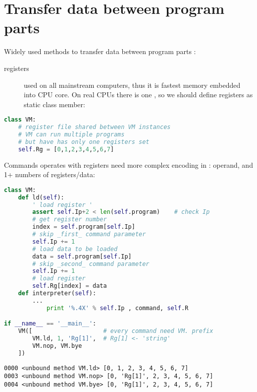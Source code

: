 \section{Transfer data between program parts}

Widely used methods to transfer data between program parts :
\begin{description}
\item[registers] used on all mainstream computers, thus it is fastest memory
embedded into CPU core. On real CPUs there is one
\href{https://en.wikipedia.org/wiki/Register_file}{}, so we
should define registers as static class member:
\end{description}

\begin{lstlisting}[language=python]
class VM:
	# register file shared between VM instances
	# VM can run multiple programs
	# but have has only one registers set 
	self.Rg = [0,1,2,3,4,5,6,7]  
\end{lstlisting}

Commands operates with registers need more complex encoding in : operand, and 1+ numbers of registers/data:

\begin{lstlisting}[language=python]
class VM:
    def ld(self):
        ' load register '
        assert self.Ip+2 < len(self.program)	# check Ip
        # get register number
        index = self.program[self.Ip]
        # skip _first_ command parameter
        self.Ip += 1                 
        # load data to be loaded
        data = self.program[self.Ip] 
        # skip _second_ command parameter
        self.Ip += 1                 
        # load register
        self.Rg[index] = data         
    def interpreter(self):
        ...
            print '%.4X' % self.Ip , command, self.R

if __name__ == '__main__':
    VM([                    # every command need VM. prefix
        VM.ld, 1, 'Rg[1]',  # Rg[1] <- 'string'
        VM.nop, VM.bye
    ])
\end{lstlisting}
\begin{lstlisting}
0000 <unbound method VM.ld> [0, 1, 2, 3, 4, 5, 6, 7]
0003 <unbound method VM.nop> [0, 'Rg[1]', 2, 3, 4, 5, 6, 7]
0004 <unbound method VM.bye> [0, 'Rg[1]', 2, 3, 4, 5, 6, 7]
\end{lstlisting}

